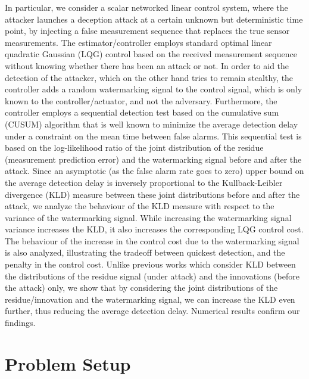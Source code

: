 \documentclass[journal,10pt]{IEEEtran}
\begin{document}
In particular, we consider a scalar networked linear control system, where the attacker launches a deception attack at a certain unknown but deterministic time point, by injecting a false measurement sequence that replaces the true sensor measurements. The estimator/controller employs standard optimal linear quadratic Gaussian (LQG) control based on the received measurement sequence without knowing whether there has been an attack or not. In order to aid the detection of the attacker, which on the other hand tries to remain stealthy, the controller adds a random watermarking signal to the control signal, which is only known to the controller/actuator, and not the adversary.  Furthermore, the controller employs a sequential detection test based on the cumulative sum (CUSUM) algorithm that is well known to minimize the average detection delay under a constraint on the mean time between false alarms. This sequential test is based on the log-likelihood ratio of the joint distribution of the residue (measurement prediction error) and the watermarking signal before and after the attack. Since an asymptotic (as the false alarm rate goes to zero) upper bound on the average detection delay  is inversely proportional to the Kullback-Leibler divergence (KLD) measure between these joint  distributions before and after the attack, we analyze the behaviour of the KLD measure with respect to the variance of the watermarking signal. While increasing the watermarking signal variance increases the KLD, it also increases the corresponding LQG control cost. The behaviour of the increase in the control cost due to the watermarking signal is also analyzed, illustrating the tradeoff between quickest detection, and the penalty in the control cost. Unlike previous works which consider KLD between the distributions of the residue signal (under attack) and the innovations (before the attack) only, we show that by considering the joint distributions of the residue/innovation and the watermarking signal, we can increase the KLD even further, thus reducing the average detection delay. Numerical results confirm our  findings. 

\section{Problem Setup}
\end{document}
